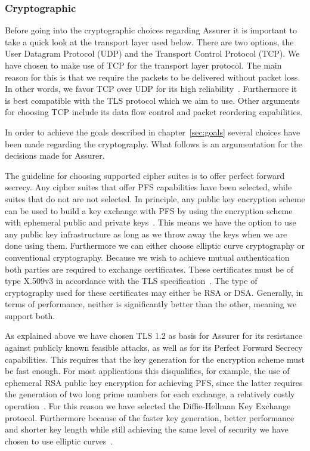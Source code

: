 \subsubsection{Cryptographic}
Before going into the cryptographic choices regarding Assurer it is important to take a quick look at the transport layer used below. There are two options, the User Datagram Protocol (UDP) and the Transport Control Protocol (TCP). We have chosen to make use of TCP for the transport layer protocol. The main reason for this is that we require the packets to be delivered without packet loss. In other words, we favor TCP over UDP for its high reliability~\cite{tcp}. Furthermore it is best compatible with the TLS protocol which we aim to use. Other arguments for choosing TCP include its data flow control and packet reordering capabilities.

In order to achieve the goals described in chapter~\ref{sec:goals} several choices have been made regarding the cryptography. What follows is an argumentation for the decisions made for Assurer. 

The guideline for choosing supported cipher suites is to offer perfect forward secrecy. Any cipher suites that offer PFS capabilities have been selected, while suites that do not are not selected. In principle, any public key encryption scheme can be used to build a key exchange with PFS by using the encryption scheme with ephemeral public and private keys~\cite{PFS}. This means we have the option to use any public key infrastructure as long as we throw away the keys when we are done using them. Furthermore we can either choose elliptic curve cryptography or conventional cryptography. Because we wish to achieve mutual authentication both parties are required to exchange certificates. These certificates must be of type X.509v3 in accordance with the TLS specification~\cite{tls1.2}. The type of cryptography used for these certificates may either be RSA or DSA. Generally, in terms of performance, neither is significantly better than the other, meaning we support both. 

As explained above we have chosen TLS 1.2 as basis for Assurer for its resistance against publicly known feasible attacks, as well as for its Perfect Forward Secrecy capabilities. This requires that the key generation for the encryption scheme must be fast enough. For most applications this disqualifies, for example, the use of ephemeral RSA public key encryption for achieving PFS, since the latter requires the generation of two long prime numbers for each exchange, a relatively costly operation~\cite{PFS}. For this reason we have selected the Diffie-Hellman Key Exchange protocol. Furthermore because of the faster key generation, better performance and shorter key length while still achieving the same level of security we have chosen to use elliptic curves~\cite{nsaecc}.

